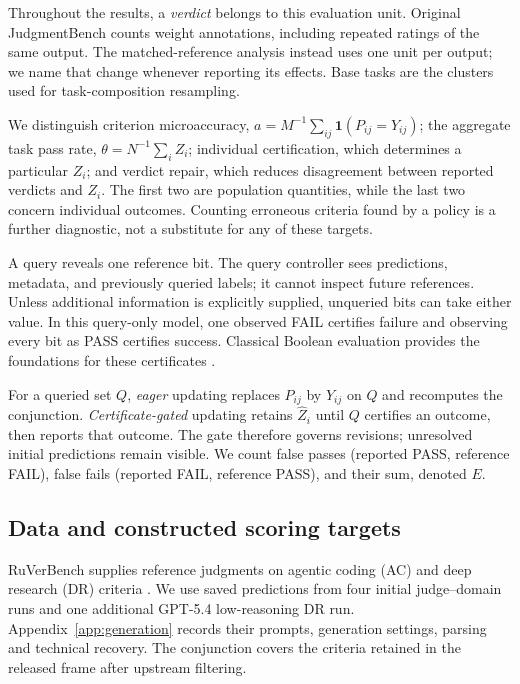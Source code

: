 \documentclass[10pt,letterpaper]{article}
\newcommand{\ind}{\mathbf{1}}
\begin{document}
Throughout the results, a \emph{verdict} belongs to this evaluation unit. Original JudgmentBench counts weight annotations, including repeated ratings of the same output. The matched-reference analysis instead uses one unit per output; we name that change whenever reporting its effects. Base tasks are the clusters used for task-composition resampling.

We distinguish criterion microaccuracy, $a=M^{-1}\sum_{ij}\ind(P_{ij}=Y_{ij})$; the aggregate task pass rate, $\theta=N^{-1}\sum_iZ_i$; individual certification, which determines a particular $Z_i$; and verdict repair, which reduces disagreement between reported verdicts and $Z_i$. The first two are population quantities, while the last two concern individual outcomes. Counting erroneous criteria found by a policy is a further diagnostic, not a substitute for any of these targets.

A query reveals one reference bit. The query controller sees predictions, metadata, and previously queried labels; it cannot inspect future references. Unless additional information is explicitly supplied, unqueried bits can take either value. In this query-only model, one observed FAIL certifies failure and observing every bit as PASS certifies success. Classical Boolean evaluation provides the foundations for these certificates \citep{gkenosis2022sbfe,unluyurt2004sequential}.

For a queried set $Q$, \emph{eager} updating replaces $P_{ij}$ by $Y_{ij}$ on $Q$ and recomputes the conjunction. \emph{Certificate-gated} updating retains $\widehat Z_i$ until $Q$ certifies an outcome, then reports that outcome. The gate therefore governs revisions; unresolved initial predictions remain visible. We count false passes (reported PASS, reference FAIL), false fails (reported FAIL, reference PASS), and their sum, denoted $E$.

\subsection{Data and constructed scoring targets}
RuVerBench supplies reference judgments on agentic coding (AC) and deep research (DR) criteria \citep{peng2026ruverbench}. We use saved predictions from four initial judge--domain runs and one additional GPT-5.4 low-reasoning DR run. Appendix~\ref{app:generation} records their prompts, generation settings, parsing and technical recovery. The conjunction covers the criteria retained in the released frame after upstream filtering.
\end{document}
